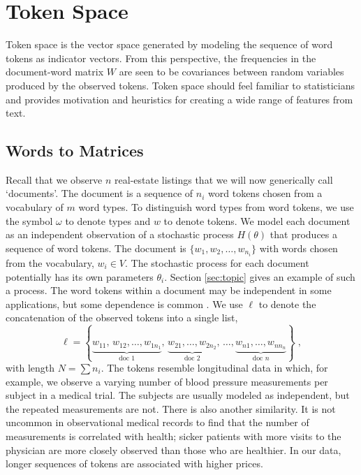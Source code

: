 \documentclass[12pt]{article}
\begin{document}
\section{Token Space}
\label{sec:tokenspace}

 Token space is the vector space generated by modeling the sequence of word
 tokens as indicator vectors.  From this perspective, the frequencies in the
 document-word matrix $W$ are seen to be covariances between random variables
 produced by the observed tokens. Token space should feel
 familiar to statisticians and provides motivation and heuristics for
 creating a wide range of features from text.


\subsection{Words to Matrices} %
\label{sec:cca}

 Recall that we observe $n$ real-estate listings that we will now generically
 call `documents'.  The \ith document is a sequence of $n_i$ word tokens 
 chosen from a vocabulary of $m$ word types.  To distinguish word types
 from word tokens, we use the symbol $\omega$ to denote types and $w$ to denote
 tokens.  We model each document as an independent observation of a stochastic
 process $H(\theta)$ that produces a sequence of word tokens.
  The \ith document is $\{w_1, w_2, \ldots, w_{n_i}\}$ with
 words chosen from the vocabulary, $w_i \in V$.  The stochastic process for each document 
 potentially has its own parameters $\theta_i$.  Section \ref{sec:topic} gives an example of such a
 process.  The word tokens within a document may be independent in some
 applications, but some dependence is common \citep[\eg][]{fosterkakade07}.
 We use $\ell$ to denote the concatenation of the observed tokens into a single list,
\begin{equation*}
   \ell = \left\{ \underbrace{w_{11},\,w_{12},\ldots,w_{1n_1}}_{\mbox{doc 1}},\,
            \underbrace{w_{21},\ldots,w_{2n_2}}_{\mbox{doc 2}}, \,
            \ldots, \underbrace{w_{n1},\ldots,w_{nn_n}}_{\mbox{doc }n} \right\}\;,
\end{equation*}
 with length $N = \sum n_i$.  The tokens resemble
  longitudinal data in which, for example, we observe a varying number
 of blood pressure measurements per subject in a medical trial.
 The subjects are usually modeled as independent,
 but the repeated measurements are not.  There is also another similarity. It is not uncommon in observational medical records to find that
 the number of measurements is correlated with health; sicker
 patients with more visits to the physician are more closely observed than those who are healthier.  In our data, longer sequences of tokens are associated with higher prices.
\end{document}
